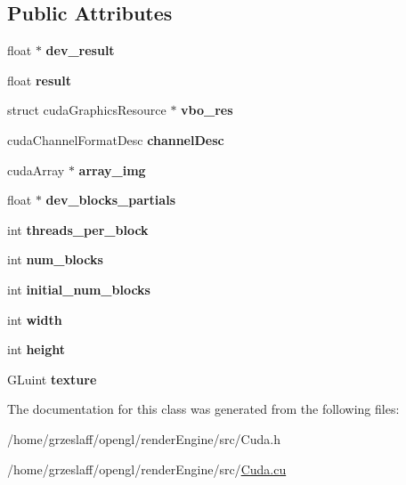 \subsection*{Public Attributes}
\begin{DoxyCompactItemize}
\item 
\hypertarget{classCuda_a376991054d4f375b8e80dbf3de814fa3}{float $\ast$ {\bfseries dev\-\_\-result}}\label{classCuda_a376991054d4f375b8e80dbf3de814fa3}

\item 
\hypertarget{classCuda_a6e17a5bea07d6e035596a65cf697f8e4}{float {\bfseries result}}\label{classCuda_a6e17a5bea07d6e035596a65cf697f8e4}

\item 
\hypertarget{classCuda_abf4d549e1fc05f40d488e5a682caebb4}{struct cuda\-Graphics\-Resource $\ast$ {\bfseries vbo\-\_\-res}}\label{classCuda_abf4d549e1fc05f40d488e5a682caebb4}

\item 
\hypertarget{classCuda_adf9319dc34ccfabc54941b701b950cb2}{cuda\-Channel\-Format\-Desc {\bfseries channel\-Desc}}\label{classCuda_adf9319dc34ccfabc54941b701b950cb2}

\item 
\hypertarget{classCuda_aa75c5110f5cba529acbb707727d94fb7}{cuda\-Array $\ast$ {\bfseries array\-\_\-img}}\label{classCuda_aa75c5110f5cba529acbb707727d94fb7}

\item 
\hypertarget{classCuda_a25c05d534e939c3df4e1825c8cc1e873}{float $\ast$ {\bfseries dev\-\_\-blocks\-\_\-partials}}\label{classCuda_a25c05d534e939c3df4e1825c8cc1e873}

\item 
\hypertarget{classCuda_a70efbe2f85ebc1996c582e9249f6ea89}{int {\bfseries threads\-\_\-per\-\_\-block}}\label{classCuda_a70efbe2f85ebc1996c582e9249f6ea89}

\item 
\hypertarget{classCuda_a1f71037e1022dc5679bf3b9a0e028d62}{int {\bfseries num\-\_\-blocks}}\label{classCuda_a1f71037e1022dc5679bf3b9a0e028d62}

\item 
\hypertarget{classCuda_acd417ec7c2d1eb3fb671c796833ddf5a}{int {\bfseries initial\-\_\-num\-\_\-blocks}}\label{classCuda_acd417ec7c2d1eb3fb671c796833ddf5a}

\item 
\hypertarget{classCuda_ab200427d68fd4992723452b63e96fbf6}{int {\bfseries width}}\label{classCuda_ab200427d68fd4992723452b63e96fbf6}

\item 
\hypertarget{classCuda_a97964aaf5a9670154ecf59e84b02f926}{int {\bfseries height}}\label{classCuda_a97964aaf5a9670154ecf59e84b02f926}

\item 
\hypertarget{classCuda_ae89727bb9410a46877d5c2f0b55a31d8}{G\-Luint {\bfseries texture}}\label{classCuda_ae89727bb9410a46877d5c2f0b55a31d8}

\end{DoxyCompactItemize}


The documentation for this class was generated from the following files\-:\begin{DoxyCompactItemize}
\item 
/home/grzeslaff/opengl/render\-Engine/src/Cuda.\-h\item 
/home/grzeslaff/opengl/render\-Engine/src/\hyperlink{Cuda_8cu}{Cuda.\-cu}\end{DoxyCompactItemize}
